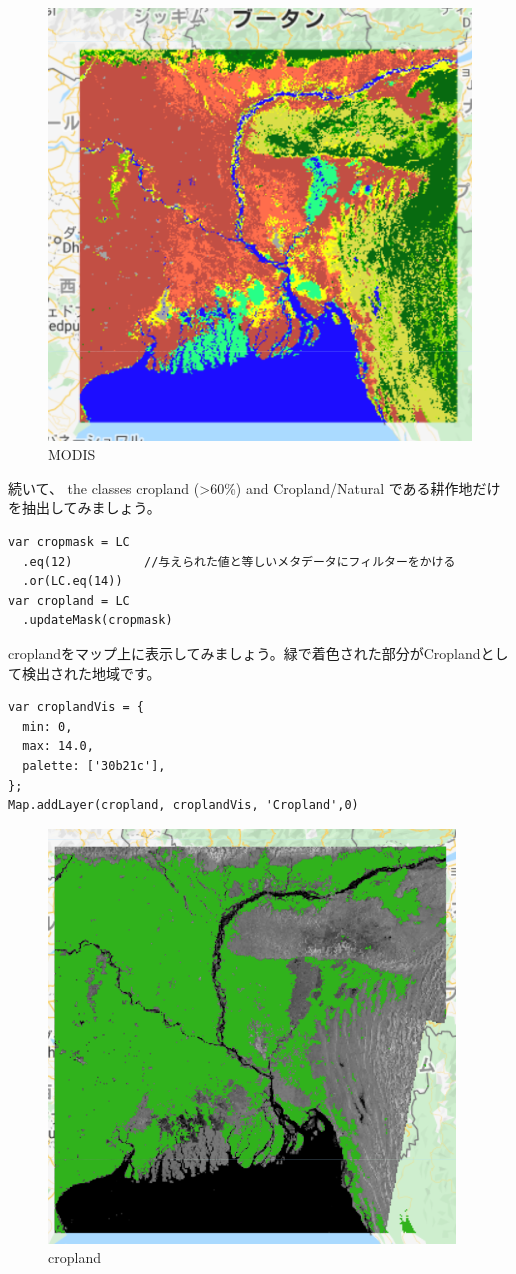 \documentclass[
]{book}
\begin{document}
\begin{figure}
\centering
\includegraphics{images/modis.png}
\caption{MODIS}
\end{figure}

続いて、 the classes cropland (\textgreater60\%) and Cropland/Natural である耕作地だけを抽出してみましょう。

\begin{verbatim}
var cropmask = LC  
  .eq(12)          //与えられた値と等しいメタデータにフィルターをかける
  .or(LC.eq(14))　 
var cropland = LC
  .updateMask(cropmask)　
\end{verbatim}

croplandをマップ上に表示してみましょう。緑で着色された部分がCroplandとして検出された地域です。

\begin{verbatim}
var croplandVis = {
  min: 0,
  max: 14.0,
  palette: ['30b21c'],
};
Map.addLayer(cropland, croplandVis, 'Cropland',0) 
\end{verbatim}

\begin{figure}
\centering
\includegraphics{images/cropland.png}
\caption{cropland}
\end{figure}
\end{document}
